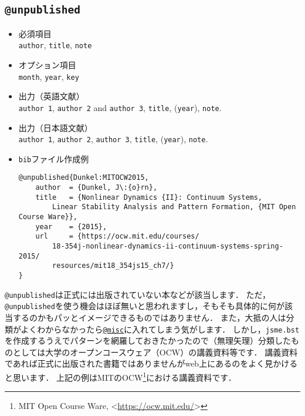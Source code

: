 \documentclass[a4paper,fleqn,uplatex,dvipdfmx]{jsarticle}
\makeatletter
\newcommand{\jsmefile}{\texttt{jsme.bst}}
\newcommand{\ttmisc}{\texttt{@misc}}
\newcommand{\ttunpublished}{\texttt{@unpublished}}
\makeatother
\begin{document}
\subsection{\ttunpublished}
\label{ssec:unpublished}
\begin{screen}
    \begin{itemize}
        \item 必須項目 \\
        \verb|author|, \verb|title|, \verb|note|
        \item オプション項目 \\
        \verb|month|, \verb|year|, \verb|key|
        \item 出力（英語文献） \\
            \colorbox[gray]{0.8}{\texttt{author 1}}, \colorbox[gray]{0.8}{\texttt{author 2}} and \colorbox[gray]{0.8}{\texttt{author 3}}, \colorbox[gray]{0.8}{\texttt{title}}, (\colorbox[gray]{0.8}{\texttt{year}}), \colorbox[gray]{0.8}{\texttt{note}}.
        \item 出力（日本語文献） \\
            \colorbox[gray]{0.8}{\texttt{author 1}}, \colorbox[gray]{0.8}{\texttt{author 2}}, \colorbox[gray]{0.8}{\texttt{author 3}}, \colorbox[gray]{0.8}{\texttt{title}}, (\colorbox[gray]{0.8}{\texttt{year}}), \colorbox[gray]{0.8}{\texttt{note}}.
        \item \verb|bib|ファイル作成例 \vspace{-3mm}
\begin{verbatim}
@unpublished{Dunkel:MITOCW2015,
    author  = {Dunkel, J\:{o}rn},
    title   = {Nonlinear Dynamics {II}: Continuum Systems, 
        Linear Stability Analysis and Pattern Formation, {MIT Open Course Ware}},
    year    = {2015},
    url     = {https://ocw.mit.edu/courses/
        18-354j-nonlinear-dynamics-ii-continuum-systems-spring-2015/
        resources/mit18_354js15_ch7/}
}
\end{verbatim}
    \end{itemize}
\end{screen}

\ttunpublished は正式には出版されていない本などが該当します．
ただ，\ttunpublished を使う機会はほぼ無いと思われますし，そもそも具体的に何が該当するのかもパッとイメージできるものではありません．
また，大抵の人は分類がよくわからなかったら\hyperref[ssec:misc]{\ttmisc}に入れてしまう気がします．
しかし，\jsmefile を作成するうえでパターンを網羅しておきたかったので（無理矢理）分類したものとしては大学のオープンコースウェア（OCW）の講義資料等です．
講義資料であれば正式に出版された書籍ではありませんがweb上にあるのをよく見かけると思います．
上記の例はMITのOCW\footnote{MIT Open Course Ware, \textless\url{https://ocw.mit.edu/}\textgreater}における講義資料です．
\end{document}

